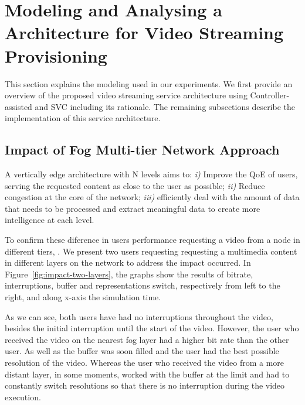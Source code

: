 \section{Modeling and Analysing a Architecture for Video Streaming Provisioning}
\label{sec:system-archi}


This section explains the modeling used in our experiments. We first provide an overview of the proposed video streaming service architecture using Controller-assisted and SVC including its rationale. The remaining subsections describe the implementation of this service architecture.

\subsection{Impact of Fog Multi-tier Network Approach}

A vertically edge architecture with N levels aims to: \textit{i)} Improve the QoE of users, serving the requested content as close to the user as possible; \textit{ii)} Reduce congestion at the core of the network; \textit{iii)} efficiently deal with the amount of data that needs to be processed and extract meaningful data to create more intelligence at each level.

To confirm these diference in users performance requesting a video from a node in different tiers, . We present two users requesting requesting a multimedia content in different layers on the network to address the impact occurred. In Figure~\ref{fig:impact-two-layers}, the graphs show the results of bitrate, interruptions, buffer and representations switch, respectively from left to the right, and along x-axis the simulation time. 

As we can see, both users have had no interruptions throughout the video, besides the initial interruption until the start of the video. However, the user who received the video on the nearest fog layer had a higher bit rate than the other user. As well as the buffer was soon filled and the user had the best possible resolution of the video. Whereas the user who received the video from a more distant layer, in some moments, worked with the buffer at the limit and had to constantly switch resolutions so that there is no interruption during the video execution.



